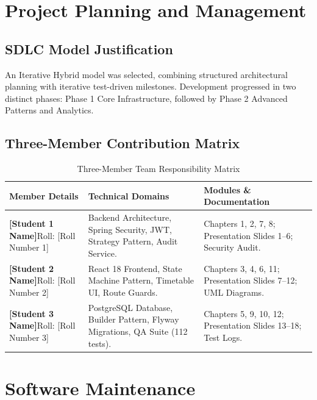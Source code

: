 \documentclass[12pt,a4paper,oneside]{report}
\begin{document}
\chapter{Project Planning and Management}

\section{SDLC Model Justification}
An Iterative Hybrid model was selected, combining structured architectural planning with iterative test-driven milestones. Development progressed in two distinct phases: Phase 1 Core Infrastructure, followed by Phase 2 Advanced Patterns and Analytics.

\section{Three-Member Contribution Matrix}
\begin{table}[h!]
\centering
\small
\begin{tabular}{p{}p{}p{}}
\toprule
\textbf{Member Details} & \textbf{Technical Domains} & \textbf{Modules \& Documentation} \\
\midrule
\textbf{[Student 1 Name]}\newline Roll: [Roll Number 1] & Backend Architecture, Spring Security, JWT, Strategy Pattern, Audit Service. & Chapters 1, 2, 7, 8; Presentation Slides 1--6; Security Audit. \\
\textbf{[Student 2 Name]}\newline Roll: [Roll Number 2] & React 18 Frontend, State Machine Pattern, Timetable UI, Route Guards. & Chapters 3, 4, 6, 11; Presentation Slides 7--12; UML Diagrams. \\
\textbf{[Student 3 Name]}\newline Roll: [Roll Number 3] & PostgreSQL Database, Builder Pattern, Flyway Migrations, QA Suite (112 tests). & Chapters 5, 9, 10, 12; Presentation Slides 13--18; Test Logs. \\
\bottomrule
\end{tabular}
\caption{Three-Member Team Responsibility Matrix}
\end{table}

\chapter{Software Maintenance}
\end{document}
